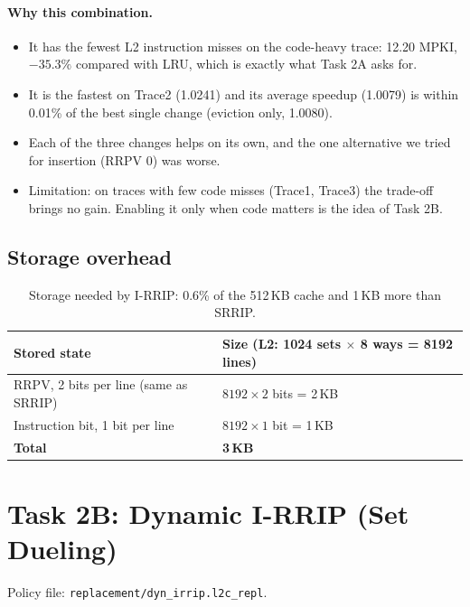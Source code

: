 \documentclass[11pt]{article}
\begin{document}
\paragraph{Why this combination.}
\begin{itemize}
  \item It has the fewest L2 instruction misses on the code-heavy trace: 12.20
        MPKI, $-35.3\%$ compared with LRU, which is exactly what Task 2A asks for.
  \item It is the fastest on Trace2 (1.0241) and its average speedup (1.0079)
        is within 0.01\% of the best single change (eviction only, 1.0080).
  \item Each of the three changes helps on its own, and the one alternative we
        tried for insertion (RRPV 0) was worse.
  \item Limitation: on traces with few code misses (Trace1, Trace3) the
        trade-off brings no gain. Enabling it only when code matters is the idea
        of Task 2B.
\end{itemize}

\subsection{Storage overhead}

\begin{table}[H]
\centering
\begin{tabular}{ll}
\toprule
Stored state & Size (L2: 1024 sets $\times$ 8 ways = 8192 lines)\\
\midrule
RRPV, 2 bits per line (same as SRRIP) & $8192 \times 2$ bits = 2\,KB\\
Instruction bit, 1 bit per line & $8192 \times 1$ bit = 1\,KB\\
\midrule
\textbf{Total} & \textbf{3\,KB}\\
\bottomrule
\end{tabular}
\caption{Storage needed by I-RRIP: 0.6\% of the 512\,KB cache and 1\,KB more than SRRIP.}
\label{tab:t2a-storage}
\end{table}

\section{Task 2B: Dynamic I-RRIP (Set Dueling)}

Policy file: \texttt{replacement/dyn\_irrip.l2c\_repl}.
\end{document}

